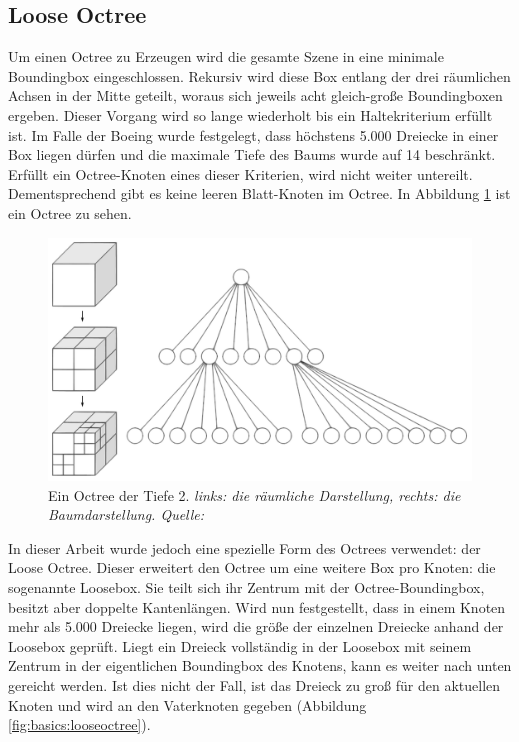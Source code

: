 \subsection{Loose Octree}
\label{sec:basics:octree}
Um einen Octree \cite{RTR3} zu Erzeugen wird die gesamte Szene in eine minimale Boundingbox eingeschlossen. Rekursiv wird diese Box entlang der drei räumlichen Achsen in der Mitte geteilt, woraus sich jeweils acht gleich-große Boundingboxen ergeben. Dieser Vorgang wird so lange wiederholt bis ein Haltekriterium erfüllt ist. Im Falle der Boeing wurde festgelegt, dass höchstens 5.000 Dreiecke in einer Box liegen dürfen und die maximale Tiefe des Baums wurde auf 14 beschränkt. Erfüllt ein Octree-Knoten eines dieser Kriterien, wird nicht weiter untereilt. Dementsprechend gibt es keine leeren Blatt-Knoten im Octree. In Abbildung \ref{fig:basics:octree} ist ein Octree zu sehen.\\
\begin{figure}
 \centering
  \includegraphics[scale=0.5]{images/octree.pdf}
  \caption{Ein Octree der Tiefe 2. \textit{links: die räumliche Darstellung, rechts: die Baumdarstellung. Quelle: }}
 \label{fig:basics:octree}
\end{figure}
In dieser Arbeit wurde jedoch eine spezielle Form des Octrees verwendet: der Loose Octree. Dieser erweitert den Octree um eine weitere Box pro Knoten: die sogenannte Loosebox. Sie teilt sich ihr Zentrum mit der Octree-Boundingbox, besitzt aber doppelte Kantenlängen. Wird nun festgestellt, dass in einem Knoten mehr als 5.000 Dreiecke liegen, wird die größe der einzelnen Dreiecke anhand der Loosebox geprüft. Liegt ein Dreieck vollständig in der Loosebox mit seinem Zentrum in der eigentlichen Boundingbox des Knotens, kann es weiter nach unten gereicht werden. Ist dies nicht der Fall, ist das Dreieck zu groß für den aktuellen Knoten und wird an den Vaterknoten gegeben (Abbildung \ref{fig:basics:looseoctree}).\\
